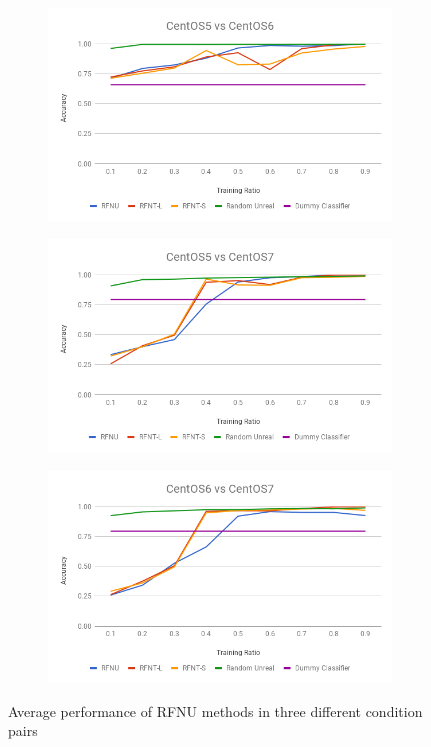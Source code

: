 \documentclass[10pt, conference, compsocconf]{IEEEtran}
\begin{document}
\begin{figure}[h!]
        \centering
        \begin{subfigure}[b]{0.8\linewidth}
                \includegraphics[width=\columnwidth]{figures/ALS/ALS-Succeed-5vs6}
        \end{subfigure}
        \begin{subfigure}[b]{0.8\linewidth}
                \includegraphics[width=\columnwidth]{figures/ALS/ALS-Succeed-5vs7}
        \end{subfigure}
        \begin{subfigure}[b]{0.8\linewidth}
                \includegraphics[width=\columnwidth]{figures/ALS/ALS-Succeed-6vs7}
        \end{subfigure}
        \caption{Average performance of RFNU methods in three different condition pairs}
        \label{fig:ALS-Succeed}
\end{figure}
\end{document}
